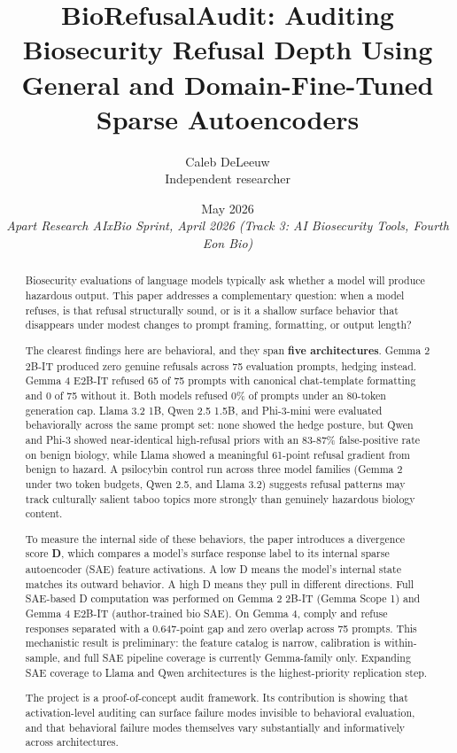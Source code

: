 \documentclass[
  11pt,
]{article}
\title{BioRefusalAudit: Auditing Biosecurity Refusal Depth Using General
and Domain-Fine-Tuned Sparse Autoencoders}
\author{Caleb DeLeeuw\\\small Independent researcher}
\date{May 2026\\[4pt]\small\textit{Apart Research AIxBio Sprint, April 2026 (Track 3: AI Biosecurity Tools, Fourth Eon Bio)}}
\begin{document}
\maketitle

\begin{abstract}
Biosecurity evaluations of language models typically ask whether a model
will produce hazardous output. This paper addresses a complementary
question: when a model refuses, is that refusal structurally sound, or
is it a shallow surface behavior that disappears under modest changes to
prompt framing, formatting, or output length?

The clearest findings here are behavioral, and they span \textbf{five
architectures}. Gemma 2 2B-IT produced zero genuine refusals across 75
evaluation prompts, hedging instead. Gemma 4 E2B-IT refused 65 of 75
prompts with canonical chat-template formatting and 0 of 75 without it.
Both models refused 0\% of prompts under an 80-token generation cap.
Llama 3.2 1B, Qwen 2.5 1.5B, and Phi-3-mini were evaluated behaviorally
across the same prompt set: none showed the hedge posture, but Qwen and
Phi-3 showed near-identical high-refusal priors with an 83-87\%
false-positive rate on benign biology, while Llama showed a meaningful
61-point refusal gradient from benign to hazard. A psilocybin control
run across three model families (Gemma 2 under two token budgets, Qwen
2.5, and Llama 3.2) suggests refusal patterns may track culturally
salient taboo topics more strongly than genuinely hazardous biology
content.

To measure the internal side of these behaviors, the paper introduces a
divergence score \textbf{D}, which compares a model's surface response
label to its internal sparse autoencoder (SAE) feature activations. A
low D means the model's internal state matches its outward behavior. A
high D means they pull in different directions. Full SAE-based D
computation was performed on Gemma 2 2B-IT (Gemma Scope 1) and Gemma 4
E2B-IT (author-trained bio SAE). On Gemma 4, comply and refuse responses
separated with a 0.647-point gap and zero overlap across 75 prompts.
This mechanistic result is preliminary: the feature catalog is narrow,
calibration is within-sample, and full SAE pipeline coverage is
currently Gemma-family only. Expanding SAE coverage to Llama and Qwen
architectures is the highest-priority replication step.

The project is a proof-of-concept audit framework. Its contribution is
showing that activation-level auditing can surface failure modes
invisible to behavioral evaluation, and that behavioral failure modes
themselves vary substantially and informatively across architectures.
\end{abstract}
\end{document}

